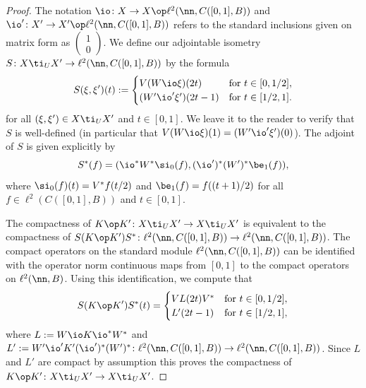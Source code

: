 \begin{proof}
The notation $\io\colon X \to X \op \ell^2(\nn,C([0,1],B))$ and $\io'\colon X' \to X' \op \ell^2(\nn,C([0,1],B))$ refers to the standard inclusions given on matrix form as $\left(\begin{smallmatrix} 1 \\ 0\end{smallmatrix}\right)$. We define our adjointable isometry $S\colon X \ti_U X' \to \ell^2( \nn, C([0,1],B))$ by the formula
\[
S(\xi,\xi')(t) := \begin{cases}
V( W \io \xi)(2t) & \text{for} \ t \in [0,1/2], \\ (W' \io' \xi')(2t - 1) & \text{for} \ t \in [1/2,1].\end{cases}
\]
for all $(\xi,\xi') \in X \ti_U X'$ and $t \in [0,1]$. We leave it to the reader to verify that $S$ is well-defined (in particular that $V(W \io \xi)(1) = (W' \io'\xi')(0)$). The adjoint of $S$ is given explicitly by
\[
S^*(f) = ( \io^* W^* \si_0(f), (\io')^* (W')^*\be_1(f)),
\]
where $\si_0(f)(t) = V^* f(t/2)$ and $\be_1(f) = f((t + 1)/2)$ for all $f \in \ell^2(C([0,1],B))$ and $t \in [0,1]$.

The compactness of $K \op K'\colon X \ti_U X' \to X \ti_U X'$ is equivalent to the compactness of $S (K \op K') S^*\colon \ell^2(\nn,C([0,1],B)) \to \ell^2(\nn,C([0,1],B))$. The compact operators on the standard module $\ell^2(\nn,C([0,1],B))$ can be identified with the operator norm continuous maps from $[0,1]$ to the compact operators on $\ell^2(\nn,B)$. Using this identification, we compute that
\[
S (K \op K') S^* (t) = \begin{cases} V L(2t) V^* & \text{for} \ t \in [0,1/2], \\ L'(2t - 1) & \text{for} \ t \in [1/2,1] ,\end{cases}
\]
where $L := W \io K \io^* W^*$ and $L' := W' \io' K' (\io')^* (W')^*\colon \ell^2(\nn,C([0,1],B)) \to \ell^2(\nn,C([0,1],B))$. Since $L$ and $L'$ are compact by assumption this proves the compactness of $K \op K'\colon X \ti_U X' \to X \ti_U X'$.
\end{proof}

